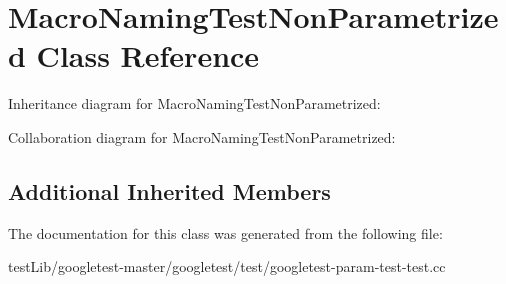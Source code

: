 \hypertarget{classMacroNamingTestNonParametrized}{}\section{Macro\+Naming\+Test\+Non\+Parametrized Class Reference}
\label{classMacroNamingTestNonParametrized}


Inheritance diagram for Macro\+Naming\+Test\+Non\+Parametrized\+:


Collaboration diagram for Macro\+Naming\+Test\+Non\+Parametrized\+:
\subsection*{Additional Inherited Members}


The documentation for this class was generated from the following file\+:\begin{DoxyCompactItemize}
\item 
test\+Lib/googletest-\/master/googletest/test/googletest-\/param-\/test-\/test.\+cc\end{DoxyCompactItemize}
